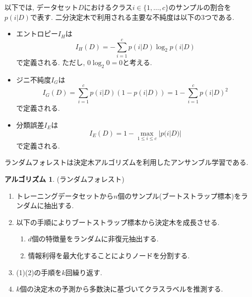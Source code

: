 \documentclass[uplatex]{jsarticle}
\theoremstyle{definition}
\newtheorem{algorithm}[definition]{アルゴリズム}
\numberwithin{equation}{section}
\begin{document}
以下では, データセット$D$におけるクラス$i \in \{1, \dots, c\}$のサンプルの割合を$p(i|D)$で表す.
二分決定木で利用される主要な不純度は以下の3つである.
\begin{itemize}
    \item
    エントロピー$I_{H}$は
    \begin{equation}
        I_{H}(D) = -\sum_{i = 1}^{c} p(i|D)\log_{2}p(i|D)
    \end{equation}
    で定義される.
    ただし, $0\log_{2}0 = 0$と考える.

    \item
    ジニ不純度$I_{G}$は
    \begin{equation}
        I_{G}(D) = \sum_{i = 1}^{c} p(i|D)(1 - p(i|D)) = 1 - \sum_{i = 1}^{c} p(i|D)^{2}
    \end{equation}
    で定義される.

    \item
    分類誤差$I_{E}$は
    \begin{equation}
        I_{E}(D) = 1 - \max_{1 \leq i \leq c} |p(i|D)|
    \end{equation}
    で定義される.
\end{itemize}

ランダムフォレストは決定木アルゴリズムを利用したアンサンブル学習である.
\begin{algorithm}
    (ランダムフォレスト)
    \begin{enumerate}
        \item
        トレーニングデータセットから$n$個のサンプル(ブートストラップ標本)をランダムに抽出する.

        \item
        以下の手順によりブートストラップ標本から決定木を成長させる.
        \begin{enumerate}
            \item
            $d$個の特徴量をランダムに非復元抽出する.

            \item
            情報利得を最大化することによりノードを分割する.
        \end{enumerate}

    \item
    (1)(2)の手順を$k$回繰り返す.

    \item
    $k$個の決定木の予測から多数決に基づいてクラスラベルを推測する.
\end{enumerate}
\end{algorithm}
\end{document}
